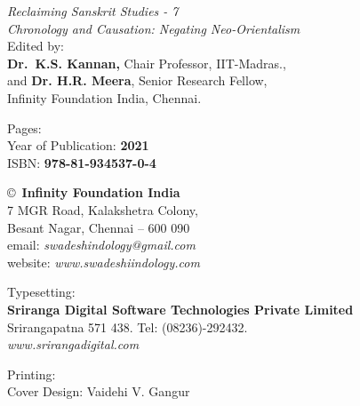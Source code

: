 \thispagestyle{empty}

\noindent
{\fontsize{9}{11}\selectfont\sl Reclaiming Sanskrit Studies - 7}\\
\textit{Chronology and Causation: Negating Neo-Orientalism}\\
Edited by:\\
 {\bf Dr.\ K.S. Kannan,} Chair Professor, IIT-Madras.,\\
and {\bf Dr. H.R. Meera}, Senior Research Fellow,\\
 Infinity Foundation India, Chennai.\\
\vfill

\noindent
Pages: {\bf\pageref{bookend}}\\
Year of Publication: {\bf 2021}\\
ISBN: {\bf 978-81-934537-0-4}\\
\vfill

\noindent
\copyright\ {\bf Infinity Foundation India}\\ 
7 MGR Road, Kalakshetra Colony,\\ 
Besant Nagar, Chennai -- 600 090\\
email: {\sl swadeshindology@gmail.com}\\
website: {\sl www.swadeshiindology.com} 
\vfill

\noindent
Typesetting:\\ 
{\bf Sriranga Digital Software Technologies Private Limited}\\ 
Srirangapatna 571 438. Tel: (08236)-292432.\\
{\sl www.srirangadigital.com}
\vfill

\noindent
Printing:\\

\noindent
Cover Design: Vaidehi V. Gangur\\ 
